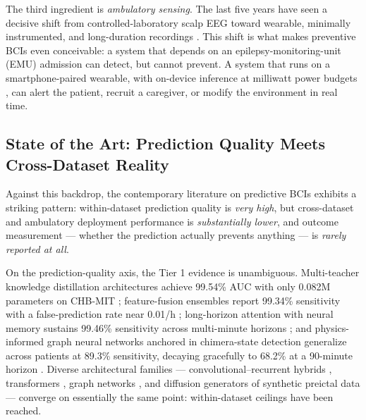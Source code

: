 The third ingredient is \emph{ambulatory sensing}. The last five years have seen a decisive shift from controlled-laboratory scalp EEG toward wearable, minimally instrumented, and long-duration recordings \cite{NasseriEtAl2021,YamakawaEtAl2020,YedurkarEtAl2025,Paneru2026,AbbasiEtAl2025,KumarEtAl2026}. This shift is what makes preventive BCIs even conceivable: a system that depends on an epilepsy-monitoring-unit (EMU) admission can detect, but cannot prevent. A system that runs on a smartphone-paired wearable, with on-device inference at milliwatt power budgets \cite{CaoEtAl2026,WangEtAl2021b,LiEtAl2025a,XuYu2026}, can alert the patient, recruit a caregiver, or modify the environment in real time.

\subsection{State of the Art: Prediction Quality Meets Cross-Dataset Reality}
\label{sec:intro-sota}

Against this backdrop, the contemporary literature on predictive BCIs exhibits a striking pattern: within-dataset prediction quality is \emph{very high}, but cross-dataset and ambulatory deployment performance is \emph{substantially lower}, and outcome measurement --- whether the prediction actually prevents anything --- is \emph{rarely reported at all}.

On the prediction-quality axis, the Tier 1 evidence is unambiguous. Multi-teacher knowledge distillation architectures achieve 99.54\% AUC with only 0.082M parameters on CHB-MIT \cite{CaoEtAl2026}; feature-fusion ensembles report 99.34\% sensitivity with a false-prediction rate near 0.01/h \cite{AlkhrijahEtAl2025}; long-horizon attention with neural memory sustains 99.46\% sensitivity across multi-minute horizons \cite{PhamTran2026}; and physics-informed graph neural networks anchored in chimera-state detection generalize across patients at 89.3\% sensitivity, decaying gracefully to 68.2\% at a 90-minute horizon \cite{AmiriEtAl2026}. Diverse architectural families --- convolutional--recurrent hybrids \cite{DaoudBayoumi2019,ChoiEtAl2022,AbdelhameedBayoumi2021}, transformers \cite{MahdiBaghdadi2026,ZhengEtAl2025,WangEtAl2026a,ShiLiu2023,GodoyEtAl2022}, graph networks \cite{ZhouEtAl2026a,AmiriEtAl2026,AbbasiEtAl2025}, and diffusion generators of synthetic preictal data \cite{JiangEtAl2024a,XuEtAl2022,PuahEtAl2025} --- converge on essentially the same point: within-dataset ceilings have been reached.


